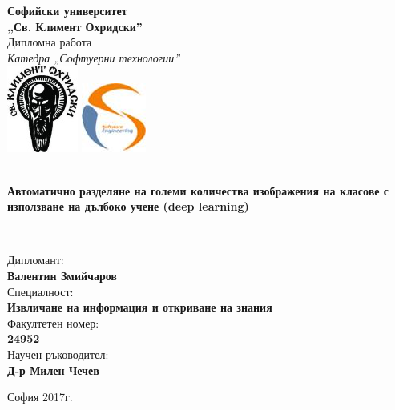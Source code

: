 \documentclass[
12pt, %
oneside, %
chapterinoneline,%
english, %
onehalfspacing, %
nolistspacing, %
headsepline, %
]{MastersDoctoralThesis} %
\begin{document}
\sloppy


\mainmatter %

\pagestyle{thesis} %


\begin{titlepage}
\begin{center}

\Large \textbf{Софийски университет \\ „Св. Климент Охридски”}\\[0cm]
\Large Дипломна работа\\[0cm]
\Large \textit{Катедра „Софтуерни технологии”}\\[0.2cm]

\includegraphics{Figures/logo_su.jpg}
\includegraphics{Figures/logo_katedra.jpg}\\[0.1cm]

\HRule \\[0.1cm] %
{\huge \bfseries Автоматично разделяне на големи количества изображения на класове с използване на дълбоко учене (deep learning)\par}\vspace{0.1cm} %
\HRule \\[0.2cm] %
 
\begin{flushleft} \large
Дипломант:\\ \textbf{Валентин Змийчаров}\\
Специалност:\\ \textbf{Извличане на информация и откриване на знания}\\
Факултетен номер:\\ \textbf{24952} \\
Научен ръководител:\\ \textbf{Д-р Милен Чечев}\\[0.2cm]
\end{flushleft}

{\large София 2017г.}\\
 
\vfill
\end{center}
\end{titlepage}
\end{document}
